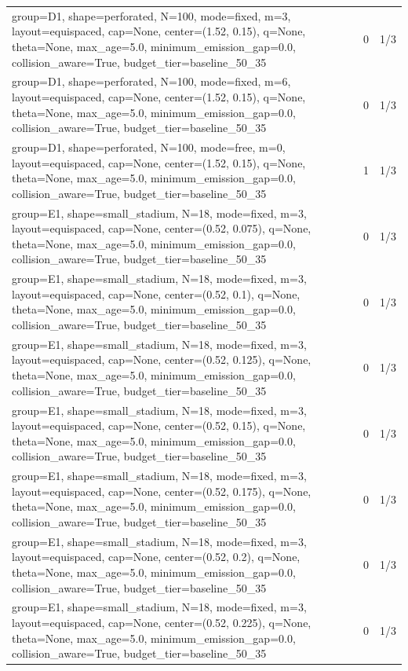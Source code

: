 \begin{tabular}{p{11cm}rr}
group=D1, shape=perforated, N=100, mode=fixed, m=3, layout=equispaced, cap=None, center=(1.52, 0.15), q=None, theta=None, max\_age=5.0, minimum\_emission\_gap=0.0, collision\_aware=True, budget\_tier=baseline\_50\_35 & 0 & 1/3 \\
group=D1, shape=perforated, N=100, mode=fixed, m=6, layout=equispaced, cap=None, center=(1.52, 0.15), q=None, theta=None, max\_age=5.0, minimum\_emission\_gap=0.0, collision\_aware=True, budget\_tier=baseline\_50\_35 & 0 & 1/3 \\
group=D1, shape=perforated, N=100, mode=free, m=0, layout=equispaced, cap=None, center=(1.52, 0.15), q=None, theta=None, max\_age=5.0, minimum\_emission\_gap=0.0, collision\_aware=True, budget\_tier=baseline\_50\_35 & 1 & 1/3 \\
group=E1, shape=small\_stadium, N=18, mode=fixed, m=3, layout=equispaced, cap=None, center=(0.52, 0.075), q=None, theta=None, max\_age=5.0, minimum\_emission\_gap=0.0, collision\_aware=True, budget\_tier=baseline\_50\_35 & 0 & 1/3 \\
group=E1, shape=small\_stadium, N=18, mode=fixed, m=3, layout=equispaced, cap=None, center=(0.52, 0.1), q=None, theta=None, max\_age=5.0, minimum\_emission\_gap=0.0, collision\_aware=True, budget\_tier=baseline\_50\_35 & 0 & 1/3 \\
group=E1, shape=small\_stadium, N=18, mode=fixed, m=3, layout=equispaced, cap=None, center=(0.52, 0.125), q=None, theta=None, max\_age=5.0, minimum\_emission\_gap=0.0, collision\_aware=True, budget\_tier=baseline\_50\_35 & 0 & 1/3 \\
group=E1, shape=small\_stadium, N=18, mode=fixed, m=3, layout=equispaced, cap=None, center=(0.52, 0.15), q=None, theta=None, max\_age=5.0, minimum\_emission\_gap=0.0, collision\_aware=True, budget\_tier=baseline\_50\_35 & 0 & 1/3 \\
group=E1, shape=small\_stadium, N=18, mode=fixed, m=3, layout=equispaced, cap=None, center=(0.52, 0.175), q=None, theta=None, max\_age=5.0, minimum\_emission\_gap=0.0, collision\_aware=True, budget\_tier=baseline\_50\_35 & 0 & 1/3 \\
group=E1, shape=small\_stadium, N=18, mode=fixed, m=3, layout=equispaced, cap=None, center=(0.52, 0.2), q=None, theta=None, max\_age=5.0, minimum\_emission\_gap=0.0, collision\_aware=True, budget\_tier=baseline\_50\_35 & 0 & 1/3 \\
group=E1, shape=small\_stadium, N=18, mode=fixed, m=3, layout=equispaced, cap=None, center=(0.52, 0.225), q=None, theta=None, max\_age=5.0, minimum\_emission\_gap=0.0, collision\_aware=True, budget\_tier=baseline\_50\_35 & 0 & 1/3 \\

\end{tabular}
